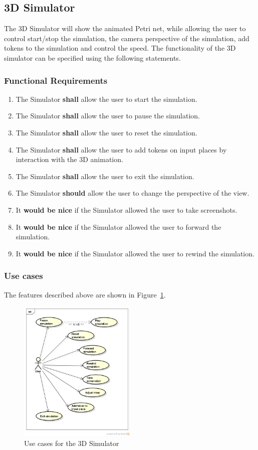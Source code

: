 \subsection{3D Simulator}
\label{sec:sf-simulator}

The 3D Simulator will show the animated Petri net, while allowing the user to control start/stop the simulation, the camera perspective of the simulation, add tokens to the simulation and control the speed. The functionality of the 3D simulator can be specified using the following statements.

\subsubsection{Functional Requirements}
\begin{enumerate}
\item The Simulator \textbf{shall} allow the user to start the simulation.
\item The Simulator \textbf{shall} allow the user to pause the simulation.
\item The Simulator \textbf{shall} allow the user to reset the simulation.
\item The Simulator \textbf{shall} allow the user to add tokens on input places by interaction with the 3D animation.
\item The Simulator \textbf{shall} allow the user to exit the simulation.
\item The Simulator \textbf{should} allow the user to change the perspective of the view.
\item It \textbf{would be nice} if the Simulator allowed the user to take screenshots.
\item It \textbf{would be nice} if the Simulator allowed the user to forward the simulation.
\item It \textbf{would be nice} if the Simulator allowed the user to rewind the simulation.
\end{enumerate}

\subsubsection{Use cases}

The features described above are shown in Figure~\ref{fig:use-cases-simulator}.

\begin{figure}[htp]
\begin{center}
  \includegraphics[width=0.5\textwidth]{image/uc-simulator.png}
  \caption{Use cases for the 3D Simulator}
  \label{fig:use-cases-simulator}
\end{center}
\end{figure}